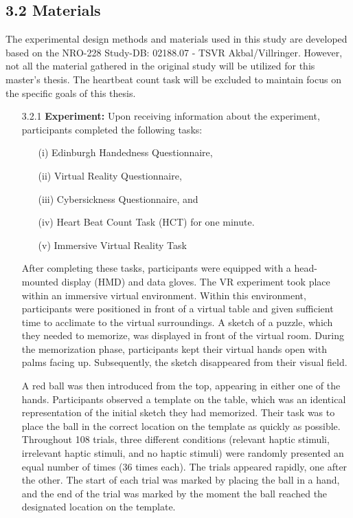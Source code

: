 \documentclass[12pt,oneside,openright]{report}
\begin{document}
\subsection*{3.2 Materials}
The experimental design methods and materials used in this study are developed based on the NRO-228 Study-DB: 02188.07 - TSVR Akbal/Villringer. However, not all the material gathered in the original study will be utilized for this master's thesis. The heartbeat count task will be excluded to maintain focus on the specific goals of this thesis.
  \begin{enumerate}
    \item[3.2.1] \textbf{Experiment:} Upon receiving information about the experiment, participants completed the following tasks:
    \begin{enumerate}
      \item[(i)] Edinburgh Handedness Questionnaire,
      \item[(ii)] Virtual Reality Questionnaire,
      \item[(iii)] Cybersickness Questionnaire, and
      \item[(iv)] Heart Beat Count Task (HCT) for one minute.
      \item[(v)] Immersive Virtual Reality Task   
    \end{enumerate}
    After completing these tasks, participants were equipped with a head-mounted display (HMD) and data gloves. The VR experiment took place within an immersive virtual environment. Within this environment, participants were positioned in front of a virtual table and given sufficient time to acclimate to the virtual surroundings. A sketch of a puzzle, which they needed to memorize, was displayed in front of the virtual room. During the memorization phase, participants kept their virtual hands open with palms facing up. Subsequently, the sketch disappeared from their visual field.

    A red ball was then introduced from the top, appearing in either one of the hands. Participants observed a template on the table, which was an identical representation of the initial sketch they had memorized. Their task was to place the ball in the correct location on the template as quickly as possible. Throughout 108 trials, three different conditions (relevant haptic stimuli, irrelevant haptic stimuli, and no haptic stimuli) were randomly presented an equal number of times (36 times each). The trials appeared rapidly, one after the other. The start of each trial was marked by placing the ball in a hand, and the end of the trial was marked by the moment the ball reached the designated location on the template.


\end{enumerate}
\end{document}
